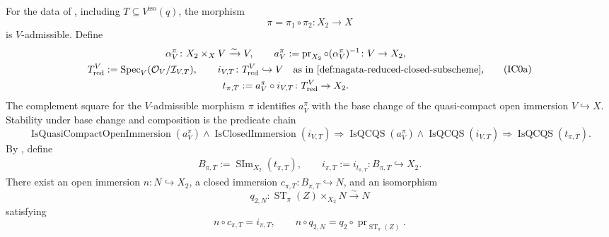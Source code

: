 \begin{lemma}
  \label{lemma:nagata-isomorphism-near-closure}

  For the data of , including
  \(T\subseteq V^{\mathrm{iso}}(q)\), the morphism
  \[
    \pi=\pi_1\circ\pi_2\colon X_2\to X
  \]
  is \(V\)-admissible.  Define
  \[
  \begin{gathered}
    \alpha_V^\pi\colon X_2\times_XV\xrightarrow{\sim}V,\qquad
    a_V^\pi:=\operatorname{pr}_{X_2}\circ(\alpha_V^\pi)^{-1}
      \colon V\to X_2,\\
    T_{\mathrm{red}}^V
      :=\operatorname{Spec}_V(\mathcal O_V/\mathcal I_{V,T}),\qquad
    i_{V,T}\colon T_{\mathrm{red}}^V\hookrightarrow V
      \quad\text{as in
        \Cref{def:nagata-reduced-closed-subscheme}},\\
    t_{\pi,T}:=a_V^\pi\circ i_{V,T}
      \colon T_{\mathrm{red}}^V\to X_2.
  \end{gathered}                                                   \tag{IC0a}
  \]
  The complement square for the $V$-admissible morphism $\pi$ identifies
  $a_V^\pi$ with the base change of the quasi-compact open immersion
  $V\hookrightarrow X$.  Stability under base change and composition is the
  predicate chain
  \[
    \operatorname{IsQuasiCompactOpenImmersion}(a_V^\pi)
      \wedge\operatorname{IsClosedImmersion}(i_{V,T})
      \Longrightarrow
    \operatorname{IsQCQS}(a_V^\pi)
      \wedge\operatorname{IsQCQS}(i_{V,T})
      \Longrightarrow
    \operatorname{IsQCQS}(t_{\pi,T}).                             \tag{IC0b}
  \]
  By ,
  define
  \[
  \begin{gathered}
    B_{\pi,T}:=\operatorname{SIm}_{X_2}(t_{\pi,T}),\qquad
    i_{\pi,T}:=i_{t_{\pi,T}}\colon B_{\pi,T}\hookrightarrow X_2.
  \end{gathered}                                                   \tag{IC0}
  \]
  There exist an open immersion \(n\colon N\hookrightarrow X_2\), a closed
  immersion \(c_{\pi,T}\colon B_{\pi,T}\hookrightarrow N\), and an
  isomorphism
  \[
    q_{2,N}\colon
      \operatorname{ST}_\pi(Z)\times_{X_2}N\xrightarrow{\sim}N
  \]
  satisfying
  \[
    n\circ c_{\pi,T}=i_{\pi,T},\qquad
    n\circ q_{2,N}
      =q_2\circ\operatorname{pr}_{\operatorname{ST}_\pi(Z)}.       \tag{IC1}
  \]
\end{lemma}

